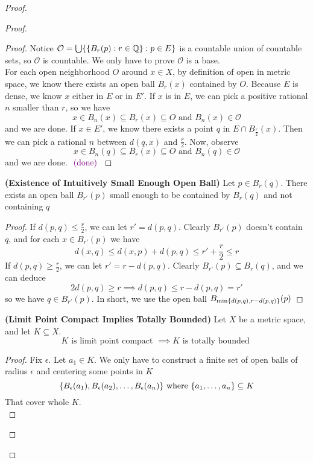\documentclass{report}
\begin{document}
\begin{proof}
\begin{proof}
\begin{proof}
Notice $\mathcal{O}=\bigcup \{ \{ B_r(p):r\in\mathbb{Q} \}:p\in E \}$ is a countable union of countable sets, so $\mathcal{O}$ is countable. We only have to prove $\mathcal{O}$ is a base.\\

For each open neighborhood $O$ around  $x\in X$, by definition of open in metric space, we know there exists an open ball $B_r(x)$ contained by $O$. Because $E$ is dense, we know  $x$ either in $E$ or in  $E'$. If $x$ is in  $E$, we can pick a positive rational  $n$ smaller than  $r$, so we have  
\begin{equation}
x\in B_n(x)\subseteq B_r(x)\subseteq O\text{ and }B_n(x)\in \mathcal{O} 
\end{equation}
and we are done. If $x\in E'$, we know there exists a point $q$ in  $E\cap B_{\frac{r}{2}}(x)$. Then we can pick a rational $n$ between $d(q,x)$ and $\frac{r}{2}$. Now, observe
\begin{equation}
x\in B_n(q)\subseteq B_r(x)\subseteq O\text{ and }B_n(q)\in \mathcal{O}
\end{equation}
and we are done. $\textcolor{violet}{\text{ (done) }}$
\end{proof}
\begin{lemma}
\label{3.5.2}
\textbf{(Existence of Intuitively Small Enough Open Ball)} Let $p\in  B_r(q)$. There exists an open ball $B_{r'}(p)$ small enough to be contained by $B_r(q)$ and not containing $q$ 
\end{lemma}
\begin{proof}
If $d(p,q)\leq \frac{r}{2}$, we can let $r'=d(p,q)$. Clearly $B_{r'}(p)$ doesn't contain $q$, and for each  $x\in B_{r'}(p)$ we have
\begin{equation}
d(x,q)\leq d(x,p)+d(p,q)\leq r'+\frac{r}{2}\leq r
\end{equation}
If $d(p,q)\geq \frac{r}{2}$, we can let $r'=r-d(p,q)$. Clearly $B_{r'}(p)\subseteq B_r(q)$, and we can deduce
\begin{equation}
2d(p,q)\geq r\implies d(p,q)\leq r-d(p,q)=r'
\end{equation}
so we have $q\in B_{r'}(p)$. In short, we use the open ball  $B_{\min \{ d(p,q),r-d(p,q) \}}(p)$
\end{proof}
\begin{theorem}
\label{3.5.3}
\textbf{(Limit Point Compact Implies Totally Bounded)} Let $X$ be a metric space, and let $K\subseteq X$.
\begin{equation}
K\text{ is limit point compact }\implies K\text{ is totally bounded }
\end{equation}
\end{theorem}
\begin{proof}
Fix $\epsilon $. Let $a_1\in K$. We only have to construct a finite set of open balls of radius $\epsilon $ and centering some points in $K$
\begin{equation}
\{ B_{\epsilon}(a_1),B_{\epsilon }(a_2),\dots ,B_{\epsilon }(a_n) \}\text{ where }\{ a_1,\dots ,a_n \}\subseteq K
\end{equation}
That cover whole $K$.\\


\end{proof}
\end{proof}
\end{proof}
\end{document}
